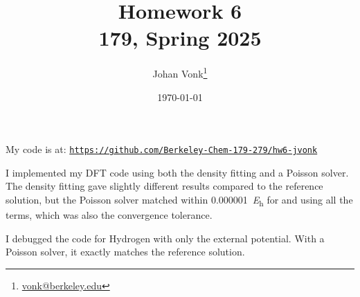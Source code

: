 \documentclass[10pt]{article}
\title{Homework 6\\\large  179, Spring 2025}
\author{Johan Vonk\thanks{\href{mailto:vonk@berkeley.edu}{vonk@berkeley.edu}}}
\date{\today}
\begin{document}
    \maketitle
    My code is at: \href{https://github.com/Berkeley-Chem-179-279/hw6-jvonk}{\texttt{https://github.com/Berkeley-Chem-179-279/hw6-jvonk}}\\
    \begin{problems}
        \item I implemented my DFT code using both the density fitting and a Poisson solver.
        The density fitting gave slightly different results compared to the reference solution, but the Poisson solver matched within \qty{0.000001}{\hartree} for  and  using all the terms, which was also the convergence tolerance.
        \item I debugged the code for Hydrogen with only the external potential.
        With a Poisson solver, it exactly matches the reference solution.
        \item {}
    \end{problems}
\end{document}
